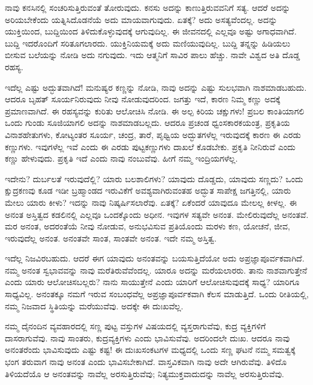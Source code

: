 ನಾವು ಕನಸಿನಲ್ಲಿ ಸಂಚರಿಸುತ್ತಿರುವಂತೆ ತೋರುವುದು. ಕನಸು ಅದನ್ನು ಕಾಣುತ್ತಿರುವವನಿಗೆ ಸತ್ಯ. ಆದರೆ ಅದನ್ನು ಅರಿಯಬೇಕೆಂದು ಯತ್ನಿಸಿದೊಡನೆಯೆ ಅದು ಮಾಯವಾಗುವುದು. ಏತಕ್ಕೆ? ಅದು ಅಸತ್ಯವೆಂದಲ್ಲ. ಅದನ್ನು ಯುಕ್ತಿಯಿಂದ, ಬುದ್ದಿಯಿಂದ ತಿಳಿದುಕೊಳ್ಳುವುದಕ್ಕೆ ಆಗುವುದಿಲ್ಲ. ಈ ಜೀವನದಲ್ಲಿ ಎಲ್ಲವೂ ಅಷ್ಟು ಅಗಾಧವಾಗಿದೆ. ಬುದ್ದಿ ಇದರೊಂದಿಗೆ ಸರಿತೂಗಲಾರದು. ಯುಕ್ತಿನಿಯಮಕ್ಕೆ ಅದು ಮಣಿಯುವುದಿಲ್ಲ. ಬುದ್ದಿ ತನ್ನನ್ನು ಹಿಡಿಯಲು ಬೀಸುವ ಬಲೆಯನ್ನು ನೋಡಿ ಅದು ನಗುವುದು. ಇದು ಆತ್ಮನಿಗೆ ಸಾವಿರ ಪಾಲು ಹೆಚ್ಚು. ನಾವೇ ವಿಶ್ವದ ಅತಿ ದೊಡ್ಡ ರಹಸ್ಯ.

ಇದೆಲ್ಲ ಎಷ್ಟು ಅದ್ಭುತವಾಗಿದೆ! ಮನುಷ್ಯರ ಕಣ್ಣನ್ನು ನೋಡಿ, ನಾವು ಅದನ್ನು ಎಷ್ಟು ಸುಲಭವಾಗಿ ನಾಶಮಾಡಬಹುದು. ಆದರೂ ಬೃಹತ್ ಸೂರ್ಯನಿರುವುದು ನೀವು ನೋಡುವುದರಿಂದ. ಜಗತ್ತು ಇದೆ, ಕಾರಣ ನಿಮ್ಮ ಕಣ್ಣು ಅದಕ್ಕೆ ಪ್ರಮಾಣವಾಗಿದೆ. ಈ ರಹಸ್ಯವನ್ನು ಕುರಿತು ಆಲೋಚಿಸಿ ನೋಡಿ. ಈ ಅಲ್ಪ ಕಿರಿಯ ಚಕ್ಷುಗಳು! ಪ್ರಬಲ ಕಾಂತಿಯಾಗಲಿ ಒಂದು ಗುಂಡು ಸೂಜಿಯಾಗಲಿ ಅದನ್ನು ನಾಶಮಾಡಬಲ್ಲದು. ಆದರೂ ಪ್ರಚಂಡ ಧ್ವಂಸಕಾರಕಯಂತ್ರ, ಪ್ರಕೃತಿಯ ವಿನಾಶಹೇತುಗಳು, ಕೋಟ್ಯಂತರ ಸೂರ್ಯ, ಚಂದ್ರ, ತಾರೆ, ಪೃಥ್ವಿಯ ಅದ್ಭುತಗಳೆಲ್ಲ ಇರುವುದಕ್ಕೆ ಕಾರಣ ಈ ಎರಡು ಕಣ್ಣುಗಳು. ಇವುಗಳೆಲ್ಲ ಇವೆ ಎಂದು ಈ ಎರಡು ಪುಟ್ಟಕಣ್ಣುಗಳು ದಾಖಲೆ ಕೊಡಬೇಕು. ಪ್ರಕೃತಿ ನೀನಿರುವೆ ಎಂದು ಕಣ್ಣು ಹೇಳುವುದು. ಪ್ರಕೃತಿ ಇದೆ ಎಂದು ನಾವು ನಂಬುವೆವು. ಹೀಗೆ ನಮ್ಮ ಇಂದ್ರಿಯಗಳೆಲ್ಲ.

ಇದೇನು? ದುರ್ಬಲತೆ ಇರುವುದೆಲ್ಲಿ? ಯಾರು ಬಲಶಾಲಿಗಳು? ಯಾವುದು ದೊಡ್ಡದು, ಯಾವುದು ಸಣ್ಣದು? ಒಂದು ಕ್ಷುದ್ರಕಣವು ಕೂಡ ಇಡೀ ಬ್ರಹ್ಮಾಂಡದ ಇರುವಿಕೆಗೆ ಅವಶ್ಯವಾಗಿರುವಂತಹ ಅದ್ಭುತ ಸಾಪೇಕ್ಷ ಜಗತ್ತಿನಲ್ಲಿ, ಯಾರು ಮೇಲು ಯಾರು ಕೀಳು? ಇದನ್ನು ನಾವು ನಿಷ್ಕರ್ಷಿಸಲಾರೆವು. ಏತಕ್ಕೆ? ಏಕೆಂದರೆ ಯಾವುದೂ ಮೇಲಲ್ಲ ಕೀಳಲ್ಲ. ಈ ಅನಂತ ಅಸ್ತಿತ್ವದ ಕಡಲಿನಲ್ಲಿ ಎಲ್ಲವೂ ಒಂದಕ್ಕೊಂದು ಅಧೀನ. ಇವುಗಳ ಸತ್ಯವೇ ಅನಂತ. ಮೇಲಿರುವುದೆಲ್ಲ ಅನಂತವೆ. ಮರ ಅನಂತ, ಅದರಂತೆಯೆ ನೀವು ನೋಡುವ, ಅನುಭವಿಸುವ ಪ್ರತಿಯೊಂದು ಮರಳು ಕಣ, ಯೋಚನೆ, ಜೀವ, ಇರುವುದೆಲ್ಲ ಅನಂತ. ಅನಂತವೇ ಸಾಂತ, ಸಾಂತವೇ ಅನಂತ. ಇದೇ ನಮ್ಮ ಅಸ್ತಿತ್ವ.

ಇದೆಲ್ಲ ನಿಜವಿರಬಹುದು. ಆದರೆ ಈಗ ಯಾವುದು ಅನಂತವನ್ನು ಬಯಸುತ್ತಿದೆಯೋ ಅದು ಅಪ್ರಜ್ಞಾಪೂರ್ವಕವಾಗಿದೆ. ನಮ್ಮ ಅನಂತ ಸ್ವಭಾವವನ್ನು ನಾವು ಮರೆತಿರುವೆವೆಂದಲ್ಲ. ಯಾರೂ ಅದನ್ನು ಮರೆಯಲಾರರು. ತಾನು ನಾಶವಾಗುತ್ತೇನೆ ಎಂದು ಯಾರು ಆಲೋಚಿಸಬಲ್ಲರು? ನಾನು ಸಾಯುತ್ತೇನೆ ಎಂದು ಯಾರಿಗೆ ಆಲೋಚಿಸುವುದಕ್ಕೆ ಸಾಧ್ಯ? ಯಾರಿಗೂ ಸಾಧ್ಯವಿಲ್ಲ. ಅನಂತಕ್ಕೂ ನಮಗೆ ಇರುವ ಸಂಬಂಧವೆಲ್ಲ ಅಪ್ರಜ್ಞಾಪೂರ್ವಕವಾಗಿ ಕೆಲಸ ಮಾಡುತ್ತಿದೆ. ಒಂದು ರೀತಿಯಲ್ಲಿ, ನಮ್ಮ ನಿಜವಾದ ಸ್ಥಿತಿಯನ್ನು ಮರೆಯುವೆವು. ಅದಕ್ಕೇ ಈ ದುಃಖವೆಲ್ಲ.

ನಮ್ಮ ದೈನಂದಿನ ವ್ಯವಹಾರದಲ್ಲಿ ಸಣ್ಣ ಪುಟ್ಟ ವಸ್ತುಗಳ ವಿಷಯದಲ್ಲಿ ವ್ಯಸ್ತರಾಗುವೆವು, ಕುದ್ರ ವ್ಯಕ್ತಿಗಳಿಗೆ ದಾಸರಾಗುವೆವು. ನಾವು ಸಾಂತರು, ಕುದ್ರವ್ಯಕ್ತಿಗಳು ಎಂದು ಭಾವಿಸುವೆವು. ಅದರಿಂದಲೇ ದುಃಖ. ಆದರೂ ನಾವು ಅನಂತರೆಂದು ಭಾವಿಸುವುದು ಎಷ್ಟು ಕಷ್ಟ! ಈ ದುಃಖಸಂಕಟಗಳ ಮಧ್ಯದಲ್ಲಿ ಒಂದು ಸಣ್ಣ ಘಟನೆ ನಮ್ಮ ಸಮತ್ವಕ್ಕೆ ಭಂಗ ತರುವಾಗ ನಾವು ಅನಂತ ಎಂದು ಭಾವಿಸಬೇಕಾಗಿದೆ. ವಾಸ್ತವಿಕವಾಗಿ ನಾವು ಅದೇ ಆಗಿರುವೆವು. ತಿಳಿದೊ ತಿಳಿಯದೆಯೊ ಆ ಅನಂತವನ್ನು ನಾವೆಲ್ಲ ಅರಸುತ್ತಿರುವೆವು; ನಿತ್ಯಮುಕ್ತವಾದುದನ್ನು ನಾವೆಲ್ಲ ಅರಸುತ್ತಿರುವೆವು.

